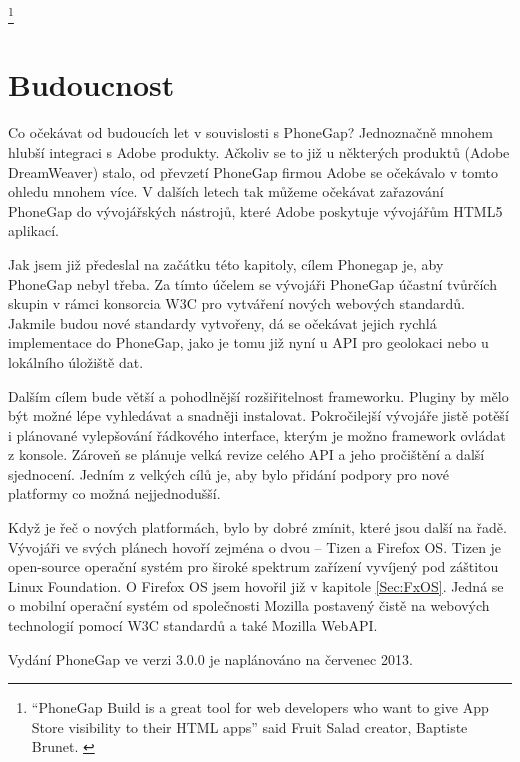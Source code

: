 \textit{} \cite{phonegap_fruit_salad}
\footnote{“PhoneGap Build is a great tool for web developers who want to give App Store visibility to their HTML apps” said Fruit Salad creator, Baptiste Brunet. \cite{phonegap_fruit_salad}} \\


\section{Budoucnost}
Co očekávat od budoucích let v souvislosti s PhoneGap? Jednoznačně mnohem hlubší integraci s Adobe produkty. Ačkoliv se to již u některých produktů (Adobe DreamWeaver) stalo, od převzetí PhoneGap firmou Adobe se očekávalo v tomto ohledu mnohem více. V dalších letech tak můžeme očekávat zařazování PhoneGap do vývojářských nástrojů, které Adobe poskytuje vývojářům HTML5 aplikací.

Jak jsem již předeslal na začátku této kapitoly, cílem Phonegap je, aby PhoneGap nebyl třeba. Za tímto účelem se vývojáři PhoneGap účastní tvůrčích skupin v rámci konsorcia W3C pro vytváření nových webových standardů. Jakmile budou nové standardy vytvořeny, dá se očekávat jejich rychlá implementace do PhoneGap, jako je tomu již nyní u API pro geolokaci nebo u lokálního úložiště dat.

Dalším cílem bude větší a pohodlnější rozšiřitelnost frameworku. Pluginy by mělo být možné lépe vyhledávat a snadněji instalovat. Pokročilejší vývojáře jistě potěší i plánované vylepšování řádkového interface, kterým je možno framework ovládat z konsole. Zároveň se plánuje velká revize celého API a jeho pročištění a další sjednocení. Jedním z velkých cílů je, aby bylo přidání podpory pro nové platformy co možná nejjednodušší.

Když je řeč o nových platformách, bylo by dobré zmínit, které jsou další na řadě. Vývojáři ve svých plánech hovoří zejména o dvou – Tizen a Firefox OS. Tizen je open-source operační systém pro široké spektrum zařízení vyvíjený pod záštitou Linux Foundation. O Firefox OS jsem hovořil již v kapitole \ref{Sec:FxOS}. Jedná se o mobilní operační systém od společnosti Mozilla postavený čistě na webových technologií pomocí W3C standardů a také Mozilla WebAPI.

Vydání PhoneGap ve verzi 3.0.0 je naplánováno na červenec 2013. \cite{cordova_roadmapprojects}